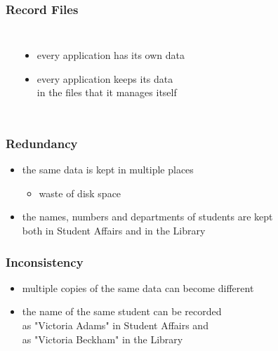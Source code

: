 \documentclass[dvipsnames]{beamer}
\theoremstyle{plain}
\begin{document}
\begin{frame}
  \frametitle{Record Files}

  \begin{columns}[b]
    \begin{center}
    \end{center}

    \begin{itemize}
      \item every application has its own data
      \item every application keeps its data\\
	in the files that it manages itself
    \end{itemize}
  \end{columns}
\end{frame}

\begin{frame}
  \frametitle{Redundancy}

  \begin{itemize}
    \item the same data is kept in multiple places
    \begin{itemize}
      \item waste of disk space
    \end{itemize}
  \end{itemize}

  \pause
  \begin{example}
    \begin{itemize}
      \item the names, numbers and departments of students are kept\\
	both in Student Affairs and in the Library
    \end{itemize}
  \end{example}
\end{frame}

\begin{frame}
  \frametitle{Inconsistency}

  \begin{itemize}
    \item multiple copies of the same data can become different
  \end{itemize}

  \pause
  \begin{example}
    \begin{itemize}
      \item the name of the same student can be recorded\\
	as "Victoria Adams" in Student Affairs and\\
	as "Victoria Beckham" in the Library
    \end{itemize}
  \end{example}
\end{frame}
\end{document}
